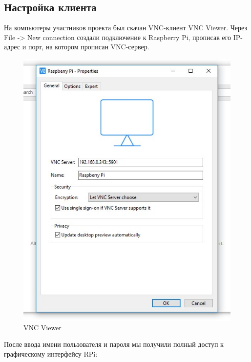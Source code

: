 \documentclass[a4paper,11pt]{article}
\begin{document}
\subsection{Настройка клиента}
На компьютеры участников проекта был скачан VNC-клиент VNC Viewer. Через File -> New connection создали подключение к Raspberry Pi, прописав его IP-адрес и порт, на котором прописан VNC-сервер.
\begin{figure}[h!]
  \begin{center}
    \includegraphics[scale=0.6]{images/image4.png}
  \caption{VNC Viewer}
  \end{center}
\end{figure}
\newpage
\noindent После ввода имени пользователя и пароля мы получили полный доступ к графическому интерфейсу RPi:
\end{document}
